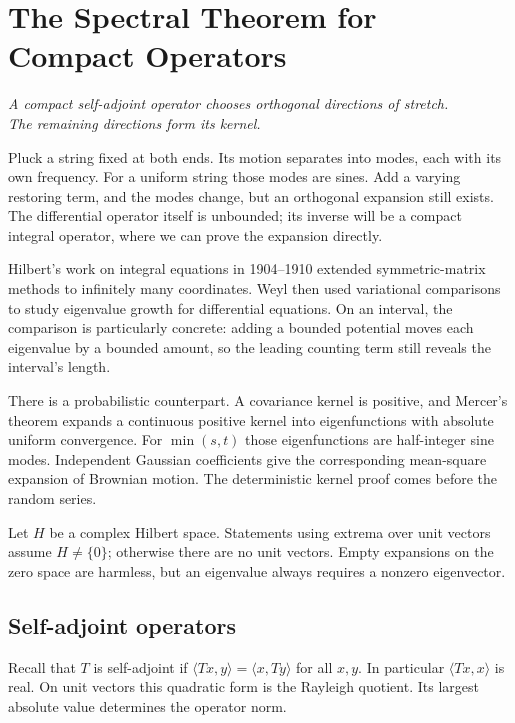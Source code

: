 \chapter{The Spectral Theorem for Compact Operators}\label{ch:spectral}

\begin{center}\itshape
A compact self-adjoint operator chooses orthogonal directions of stretch.\\
The remaining directions form its kernel.
\end{center}

Pluck a string fixed at both ends. Its motion separates into modes, each with its own frequency. For a uniform string those modes are sines. Add a varying restoring term, and the modes change, but an orthogonal expansion still exists. The differential operator itself is unbounded; its inverse will be a compact integral operator, where we can prove the expansion directly.

Hilbert's work on integral equations in 1904--1910 extended symmetric-matrix methods to infinitely many coordinates. Weyl then used variational comparisons to study eigenvalue growth for differential equations. On an interval, the comparison is particularly concrete: adding a bounded potential moves each eigenvalue by a bounded amount, so the leading counting term still reveals the interval's length.

There is a probabilistic counterpart. A covariance kernel is positive, and Mercer's theorem expands a continuous positive kernel into eigenfunctions with absolute uniform convergence. For $\min(s,t)$ those eigenfunctions are half-integer sine modes. Independent Gaussian coefficients give the corresponding mean-square expansion of Brownian motion. The deterministic kernel proof comes before the random series.

Let $H$ be a complex Hilbert space. Statements using extrema over unit vectors assume $H\ne\{0\}$; otherwise there are no unit vectors. Empty expansions on the zero space are harmless, but an eigenvalue always requires a nonzero eigenvector.

\section{Self-adjoint operators}

Recall that $T$ is self-adjoint if $\langle Tx,y\rangle=\langle x,Ty\rangle$ for all $x,y$. In particular $\langle Tx,x\rangle$ is real. On unit vectors this quadratic form is the Rayleigh quotient. Its largest absolute value determines the operator norm.

